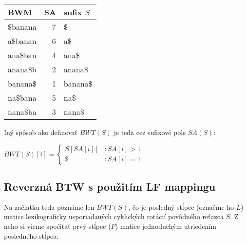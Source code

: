     \bigskip
    
    \begin{example}
        \begin{tabular}{ | l  | r | l | }
            \hline
            \textbf{BWM} & \textbf{SA} & \textbf{sufix $S$} \\ \hline 
            \$banana     & 7           & \$                 \\ \hline
            a\$banan     & 6           & a\$                \\ \hline
            ana\$ban     & 4           & ana\$              \\ \hline
            anana\$b     & 2           & anana\$            \\ \hline
            banana\$     & 1           & banana\$           \\ \hline
            na\$bana     & 5           & na\$               \\ \hline
            nana\$ba     & 3           & nana\$             \\ \hline
        \end{tabular}
    \end{example}
    
    \bigskip
    
    Iný spôsob ako definovať $BWT(S)$ je teda cez sufixové pole $SA(S)$:
    
    \bigskip
    
    $
        BWT(S)[i] = \begin{cases}
                        S[SA[i]] & : SA[i] > 1 \\ 
                        \$       & : SA[i] = 1
                    \end{cases}
    $                    
    
    \subsection{Reverzná BTW s použitím LF mappingu}
    Na začiatku teda poznáme len $BWT(S)$, čo je posledný stĺpec (označme ho
    $L$) matice lexikograficky usporiadaných cyklických rotácií povôdného
    reťazca $S$. Z neho si vieme spočitať prvý stĺpec ($F$) matice jednoduchým
    utriedením posledného stĺpca:
    
    \bigskip
    
